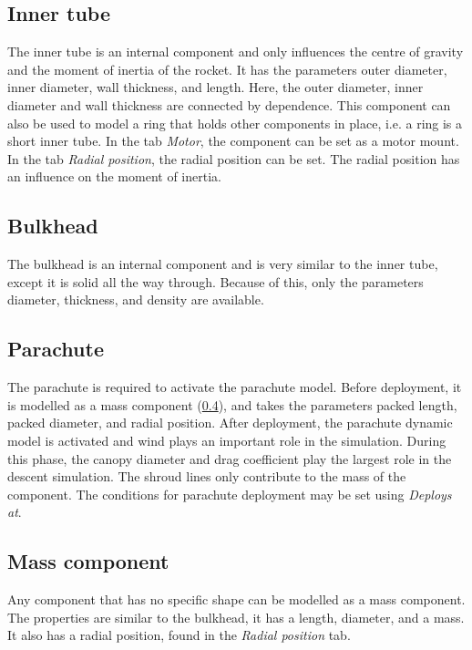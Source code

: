 \documentclass[11pt, a4paper]{article}
\begin{document}
\subsection{Inner tube}

The inner tube is an internal component and only influences the centre of gravity and the moment of inertia of the rocket. It has the parameters outer diameter, inner diameter, wall thickness, and length. Here, the outer diameter, inner diameter and wall thickness are connected by dependence. This component can also be used to model a ring that holds other components in place, i.e. a ring is a short inner tube. In the tab \emph{Motor}, the component can be set as a motor mount. In the tab \emph{Radial position}, the radial position can be set. The radial position has an influence on the moment of inertia.

\subsection{Bulkhead}

The bulkhead is an internal component and is very similar to the inner tube, except it is solid all the way through. Because of this, only the parameters diameter, thickness, and density are available. 

\subsection{Parachute}

The parachute is required to activate the parachute model. Before deployment, it is modelled as a mass component (\cref{subsec:masscomp}), and takes the parameters packed length, packed diameter, and radial position. After deployment, the parachute dynamic model is activated and wind plays an important role in the simulation. During this phase, the canopy diameter and drag coefficient play the largest role in the descent simulation. The shroud lines only contribute to the mass of the component. The conditions for parachute deployment may be set using \emph{Deploys at}.

\subsection{Mass component} \label{subsec:masscomp}

Any component that has no specific shape can be modelled as a mass component. The properties are similar to the bulkhead, it has a length, diameter, and a mass. It also has a radial position, found in the \emph{Radial position} tab. 
\end{document}
